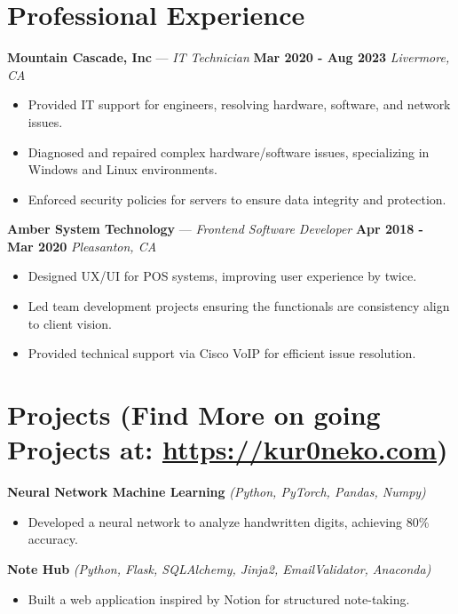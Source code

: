 \documentclass[letterpaper,11pt]{article}
\begin{document}
\section{Professional Experience}
\textbf{Mountain Cascade, Inc} — \textit{IT Technician} \hfill \textbf{Mar 2020 - Aug 2023}  
\textit{Livermore, CA}
\begin{itemize}[leftmargin=0.15in, label={$\bullet$}]
    \item Provided IT support for engineers, resolving hardware, software, and network issues.
    \item Diagnosed and repaired complex hardware/software issues, specializing in Windows and Linux environments.
    \item Enforced security policies for servers to ensure data integrity and protection.
\end{itemize}
\textbf{Amber System Technology} — \textit{Frontend Software Developer} \hfill \textbf{Apr 2018 - Mar 2020}  
\textit{Pleasanton, CA}
\begin{itemize}[leftmargin=0.15in, label={$\bullet$}]
    \item Designed UX/UI for POS systems, improving user experience by twice.
    \item Led team development projects ensuring the functionals are consistency align to client vision.
    \item Provided technical support via Cisco VoIP for efficient issue resolution.
\end{itemize}


\section{Projects (Find More on going Projects at: \href{https://kur0neko.com}{https://kur0neko.com})}
\textbf{Neural Network Machine Learning} \textit{(Python, PyTorch, Pandas, Numpy)}  
\begin{itemize}[leftmargin=0.15in, label={}]
    \item Developed a neural network to analyze handwritten digits, achieving 80\% accuracy.
\end{itemize}
\textbf{Note Hub} \textit{(Python, Flask, SQLAlchemy, Jinja2, EmailValidator, Anaconda)}  
\begin{itemize}[leftmargin=0.15in, label={}]
    \item Built a web application inspired by Notion for structured note-taking.
\end{itemize}
\end{document}
